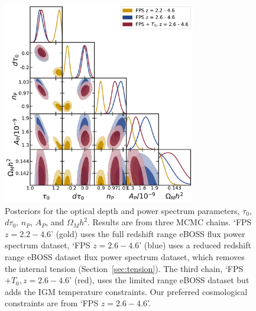 \begin{figure}
    \centering
    \includegraphics[width=0.75\textwidth]{figures/cosmo_corner.pdf}
    \caption{\label{fig:cosmo_corner}
    Posteriors for the optical depth and power spectrum parameters, $\tau_0$, $d\tau_0$, $n_P$, $A_P$, and $\Omega_M h^2$.
    Results are from three MCMC chains.
    `FPS $z=2.2-4.6$' (gold) uses the full redshift range eBOSS flux power spectrum dataset, `FPS $z=2.6-4.6$' (blue) uses a reduced redshift range eBOSS dataset flux power spectrum dataset, which removes the internal tension (Section~\protect\ref{sec:tension}).
    The third chain, `FPS $+ T_0, z=2.6-4.6$' (red), uses the limited range eBOSS dataset but adds the IGM temperature constraints.
    Our preferred cosmological constraints are from `FPS $z=2.6-4.6$'.
    }
\end{figure}

